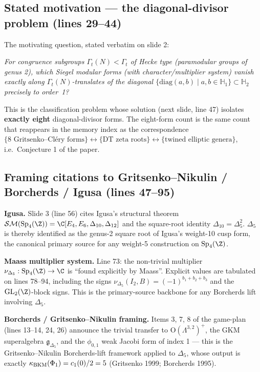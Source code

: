 \subsection*{Stated motivation --- the diagonal-divisor problem
(lines 29--44)}

The motivating question, stated verbatim on slide 2:

\emph{For congruence subgroups $\Gamma_t(N)<\Gamma_t$ of Hecke type
(paramodular groups of genus 2), which Siegel modular forms (with
character/multiplier system) vanish exactly along $\Gamma_t(N)$-translates
of the diagonal $\{\mathrm{diag}(a,b)\mid a,b\in\mathbb{H}_1\}\subset
\mathbb{H}_2$ precisely to order~1?}

This is the classification problem whose solution (next slide, line 47)
isolates \textbf{exactly eight} diagonal-divisor forms. The eight-form
count is the same count that reappears in the memory index as the
correspondence $\{\text{8 Gritsenko--Cl\'ery forms}\}
\leftrightarrow \{\text{DT zeta roots}\}
\leftrightarrow \{\text{twined elliptic genera}\}$, i.e.\ Conjecture 1
of the paper.

\subsection*{Framing citations to Gritsenko--Nikulin / Borcherds / Igusa
(lines 47--95)}

\textbf{Igusa.} Slide 3 (line 56) cites Igusa's structural theorem
$\SM(\Sp_4(\Z))=\C[E_4,E_6,\Delta_{10},\Delta_{12}]$ and the square-root
identity $\Delta_{10}=\Delta_5^2$. $\Delta_5$ is thereby identified as
the genus-2 square root of Igusa's weight-10 cusp form, the canonical
primary source for any weight-5 construction on $\Sp_4(\Z)$.

\textbf{Maass multiplier system.} Line 73: the non-trivial multiplier
$\nu_{\Delta_5}:\Sp_4(\Z)\to\C$ is ``found explicitly by Maass''.
Explicit values are tabulated on lines 78--94, including the signs
$\nu_{\Delta_5}(I_2,B)=(-1)^{b_1+b_2+b_3}$ and the $\GL_2(\Z)$-block
signs. This is the primary-source backbone for any Borcherds lift
involving $\Delta_5$.

\textbf{Borcherds / Gritsenko--Nikulin framing.} Items 3, 7, 8 of the
game-plan (lines 13--14, 24, 26) announce the trivial transfer to
$\mathrm{O}(\Lambda^{3,2})^+$, the GKM superalgebra
$\mathfrak{g}_{\Delta_5}$, and the $\phi_{0,1}$ weak Jacobi form of
index 1 --- this is the Gritsenko--Nikulin Borcherds-lift framework
applied to $\Delta_5$, whose output is exactly
$\kappa_{\mathrm{BKM}}(\Phi_1)=c_1(0)/2=5$ (Gritsenko 1999; Borcherds 1995).

